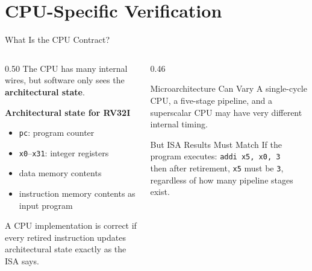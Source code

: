 \documentclass[aspectratio=169,10pt]{beamer}
\begin{document}
\section{CPU-Specific Verification}

\begin{frame}{What Is the CPU Contract?}
  \begin{columns}[T]
    \begin{column}{0.50\textwidth}
      The CPU has many internal wires, but software only sees the \textbf{architectural state}.

      \vspace{0.7em}
      \textbf{Architectural state for RV32I}
      \begin{itemize}
        \item \texttt{pc}: program counter
        \item \texttt{x0}--\texttt{x31}: integer registers
        \item data memory contents
        \item instruction memory contents as input program
      \end{itemize}

      \vspace{0.7em}
      A CPU implementation is correct if every retired instruction updates architectural state exactly as the ISA says.
    \end{column}
    \begin{column}{0.46\textwidth}
      \begin{block}{Microarchitecture Can Vary}
        A single-cycle CPU, a five-stage pipeline, and a superscalar CPU may have very different internal timing.
      \end{block}

      \vspace{0.6em}
      \begin{exampleblock}{But ISA Results Must Match}
        If the program executes:
        \texttt{addi x5, x0, 3}\\
        then after retirement, \texttt{x5} must be \texttt{3}, regardless of how many pipeline stages exist.
      \end{exampleblock}
    \end{column}
  \end{columns}
\end{frame}
\end{document}
